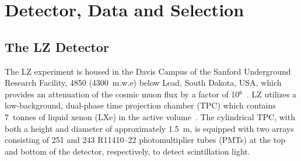 \documentclass[reprint, showpacs,
preprintnumbers,
amsmath,amssymb,
aps, floatfix,
superscriptaddress,
prd, nofootinbib]{revtex4-1}
\begin{document}
        

\section{\label{sec:lz_data_selection} Detector, Data and Selection}
\subsection{\label{subsec:selection}The LZ Detector} 
The LZ experiment is housed in the Davis Campus of the Sanford Underground Research Facility, 4850 (4300~m.w.e) below Lead, South Dakota, USA, which provides an attenuation of the cosmic muon flux by a factor of 10$^6$~\cite{LZ:Experiment_2020,LZ:TDR_2017}.
LZ utilizes a low-background, dual-phase time projection chamber (TPC) which contains 7~tonnes of liquid xenon (LXe) in the active volume~\cite{LZ:Experiment_2020,LZ:TDR_2017}. 
The cylindrical TPC, with both a height and diameter of approximately 1.5~m, is equipped with two arrays consisting of 251 and 243 R11410–22 photomultiplier tubes (PMTs) at the top and bottom of the detector, respectively, to detect scintillation light. 
\end{document}
